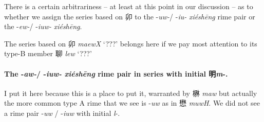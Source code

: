 There is a certain arbitrariness -- at least at this point in our discussion -- as to whether we assign the series based on 
卯 to the -\textit{uw-}/ -\textit{iu-} \textit{xiéshēng} rime pair or the -\textit{ew-}/ -\textit{iuw-} \textit{xiéshēng}. 

The series based on 
卯 %
\textit{maewX} `???' belongs here if we pay most attention to its  type-B member 
聊 %
\textit{lew} `???' %




\paragraph{The -\textit{aw-}/ -\textit{iuw-} \textit{xiéshēng} rime pair in series with initial 明\textit{m}-.}

I put it here because this is a place to put it, warranted by 楙 \textit{maw} but actually the more common type A rime that we see is 
-\textit{uw} as in 懋 \textit{muwH}. We did not see a rime pair -\textit{uw} / -\textit{iuw} with initial \textit{l}-. 


